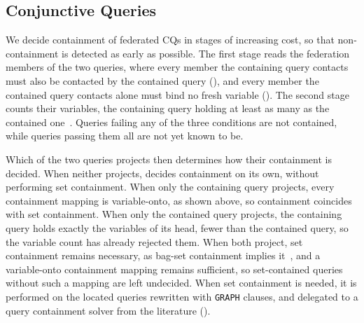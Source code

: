 \subsection{Conjunctive Queries}\label{sec:algorithm}

We decide containment of federated \acp{CQ} in stages of increasing cost, so that non-containment is detected as early as possible.
The first stage reads the federation members of the two queries, where every member the containing query contacts must also be contacted by the contained query (), and every member the contained query contacts alone must bind no fresh variable ().
The second stage counts their variables, the containing query holding at least as many as the contained one~\cite[Theorem~12]{Afrati2010}.
Queries failing any of the three conditions are not contained, while queries passing them all are not yet known to be.

Which of the two queries projects then determines how their containment is decided.
When neither projects,  decides containment on its own, without performing set containment.
When only the containing query projects, every containment mapping is variable-onto, as shown above, so containment coincides with set containment.
When only the contained query projects, the containing query holds exactly the variables of its head, fewer than the contained query, so the variable count has already rejected them.
When both project, set containment remains necessary, as bag-set containment implies it~\cite[Proposition~2, Case~1]{Afrati2010}, and a variable-onto containment mapping remains sufficient, so set-contained queries without such a mapping are left undecided.
When set containment is needed, it is performed on the located queries rewritten with \texttt{GRAPH} clauses, and delegated to a query containment solver from the literature ().

